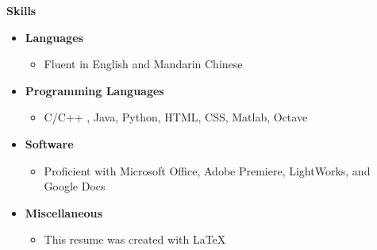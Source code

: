 \documentclass[letterpaper,11pt]{article}
\newcommand{\resheading}[1]{{\large \colorbox{mygrey}{\begin{minipage}{\textwidth}{\textbf{#1 \vphantom{p\^{E}}}}\end{minipage}}}}
\newcommand{\myitem}[1]{\item #1 \vspace{-9pt}}
\newcommand{\mysubitem}[1]{\item #1 \vspace{-4pt}}
\begin{document}
\resheading{Skills}
	\begin{itemize}
		\myitem {\textbf{Languages}}
			\begin{itemize}
				\mysubitem {Fluent in English and Mandarin Chinese}
			\end{itemize} \vspace{-9pt}
		\myitem {\textbf{Programming Languages}}
			\begin{itemize}
				\mysubitem {C/C++ , Java, Python, HTML, CSS, Matlab, Octave}
			\end{itemize} \vspace{-9pt}
		\myitem {\textbf{Software}}
			\begin{itemize}
				\mysubitem {Proficient with Microsoft Office, Adobe Premiere, LightWorks, and Google Docs}
			\end{itemize} \vspace{-9pt}
		\myitem {\textbf{Miscellaneous}}
			\begin{itemize}
				\mysubitem {This resume was created with \LaTeX}
			\end{itemize} \vspace{-9pt}
	\end{itemize}

\vspace{-6pt}
\end{document}
